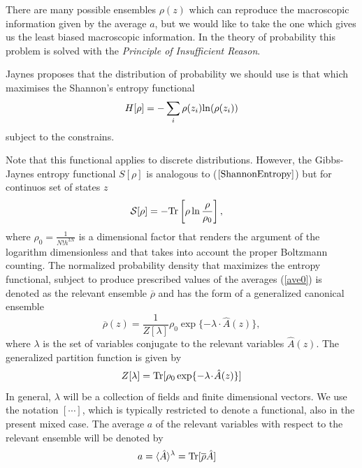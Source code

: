 \documentclass[b5paper,openright,10pt]{book}
\begin{document}
There are many possible ensembles $\rho(z)$ which can reproduce the macroscopic information given by the average $a$, but we would like to take the one which gives us the least biased macroscopic information.
In the theory of probability this problem is solved with the {\it Principle of Insufficient Reason}. 

Jaynes \cite{Jaynes1957} proposes that the distribution of probability we should use is that which maximises the Shannon's entropy functional
\begin{align}
    H[\rho] = -\sum_i\rho(z_i){\rm ln}(\rho(z_i))
    \label{ShannonEntropy}
\end{align}
subject to the constrains.

Note that this functional applies to discrete distributions. However, the Gibbs-Jaynes entropy functional $S[\rho]$ is analogous to ($\ref{ShannonEntropy}$) but for continuos set of states $z$
\begin{align}
 {\cal S}[\rho]&=-{\rm Tr}\left[\rho\ln\frac{\rho}{\rho_0}\right],
\label{entropy}
\end{align}
where  $\rho_0=\frac{1}{N!h^{3N}}$
is  a dimensional  factor that renders  the argument  of the
logarithm  dimensionless  and  that  takes  into  account  the  proper
Boltzmann  counting.  The normalized  probability  density  that maximizes  the
entropy  functional,  subject  to  produce prescribed  values  of  the
averages  (\ref{ave0})  is  denoted  as the relevant  ensemble
$\overline{\rho}$ and has the form of a generalized canonical ensemble
\begin{equation}
\overline{\rho}(z) = \frac{1}{Z[\lambda]} \rho_0\exp\{-\lambda\!\cdot\!\hat{A}(z)\}, 
\label{relens1}
\end{equation}
where
$\lambda$ is the set of variables conjugate  to the relevant
variables $\hat{A}(z)$.  The generalized partition function is given by
\begin{equation}
Z[\lambda] = {\rm Tr}[\rho_0\exp
    \{-\lambda\!\cdot\!\hat{A}(z)\}]
\end{equation}
In general, $\lambda$  will be a collection of  fields and finite
dimensional  vectors.  We  use  the notation  $[\cdots]$,  which  is
typically restricted  to denote  a functional,  also in  the present
mixed case.  The average $a$ of the relevant variables with respect
to the relevant ensemble will be denoted by
\begin{align}
  a &=\langle \hat{A}\rangle^\lambda ={\rm Tr}[\overline{\rho}\hat{A}]
\end{align}
\end{document}
